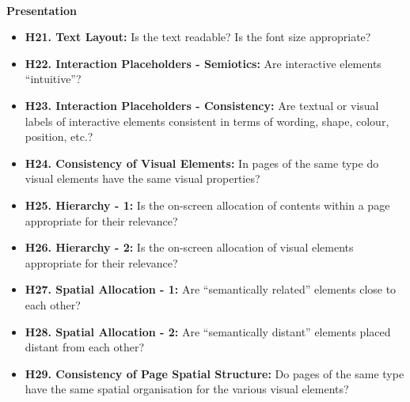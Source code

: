 \\

\textbf{Presentation}
\begin{itemize}
    \item \textbf{H21.  Text Layout:} Is the text readable? Is the font size appropriate?
    \item \textbf{H22.  Interaction Placeholders - Semiotics:} Are interactive elements “intuitive”?
    \item \textbf{H23.  Interaction Placeholders - Consistency:} Are textual or visual labels of interactive elements consistent in terms of wording, shape, colour, position, etc.?
    \item \textbf{H24.  Consistency of Visual Elements:} In pages of the same type do visual elements have the same visual properties?
    \item \textbf{H25.  Hierarchy - 1:} Is the on-screen allocation of contents within a page appropriate for their relevance?
    \item \textbf{H26.  Hierarchy - 2:} Is the on-screen allocation of visual elements appropriate for their relevance?
    \item \textbf{H27.  Spatial Allocation - 1:} Are “semantically related” elements close to each other?
    \item \textbf{H28.  Spatial Allocation - 2:} Are “semantically distant” elements placed distant from each other?
    \item \textbf{H29.  Consistency of Page Spatial Structure:} Do pages of the same type have the same spatial organisation for the various visual elements?
\end{itemize}
